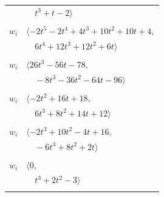 \documentclass[11pt]{article}
\begin{document}
\begin{longtable}{@{}ll@{}}
 & $\quad t^{3}+t-2\rangle$\\
\addlinespace[2pt]
\multicolumn{2}{@{}p{0.97\textwidth}@{}}{$i=17$, $D_i=1$, $\rho_{ij}$: $3{:}1, \allowbreak 4{:}2, \allowbreak 5{:}1, \allowbreak 6{:}1, \allowbreak 11{:}1, \allowbreak 16{:}2, \allowbreak 26{:}2, \allowbreak 27{:}1$}\\
$w_i$ & $\langle -2t^{5}-2t^{4}+4t^{3}+10t^{2}+10t+4,$\\
 & $\quad 6t^{4}+12t^{3}+12t^{2}+6t\rangle$\\
\addlinespace[2pt]
\multicolumn{2}{@{}p{0.97\textwidth}@{}}{$i=18$, $D_i=1$, $\rho_{ij}$: $0{:}2, \allowbreak 1{:}2, \allowbreak 3{:}1, \allowbreak 5{:}2, \allowbreak 6{:}2, \allowbreak 9{:}2, \allowbreak 13{:}1, \allowbreak 14{:}1, \allowbreak 23{:}1, \allowbreak 24{:}1, \allowbreak 28{:}1, \allowbreak 36{:}1, \allowbreak 37{:}2, \allowbreak 40{:}2, \allowbreak 43{:}2$}\\
$w_i$ & $\langle 26t^{3}-56t-78,$\\
 & $\quad -8t^{3}-36t^{2}-64t-96\rangle$\\
\addlinespace[2pt]
\multicolumn{2}{@{}p{0.97\textwidth}@{}}{$i=19$, $D_i=1$, $\rho_{ij}$: $0{:}2, \allowbreak 1{:}1, \allowbreak 3{:}1, \allowbreak 12{:}1, \allowbreak 15{:}1, \allowbreak 28{:}2, \allowbreak 29{:}2, \allowbreak 32{:}2, \allowbreak 42{:}1, \allowbreak 43{:}2$}\\
$w_i$ & $\langle -2t^{2}+16t+18,$\\
 & $\quad 6t^{3}+8t^{2}+14t+12\rangle$\\
\addlinespace[2pt]
\multicolumn{2}{@{}p{0.97\textwidth}@{}}{$i=20$, $D_i=1$, $\rho_{ij}$: $13{:}1, \allowbreak 14{:}2, \allowbreak 15{:}1, \allowbreak 22{:}2, \allowbreak 32{:}2, \allowbreak 37{:}1, \allowbreak 38{:}2, \allowbreak 41{:}1$}\\
$w_i$ & $\langle -2t^{3}+10t^{2}-4t+16,$\\
 & $\quad -6t^{3}+8t^{2}+2t\rangle$\\
\addlinespace[2pt]
\multicolumn{2}{@{}p{0.97\textwidth}@{}}{$i=21$, $D_i=1$, $\rho_{ij}$: $3{:}2, \allowbreak 10{:}1, \allowbreak 12{:}2, \allowbreak 35{:}1, \allowbreak 38{:}1$}\\
$w_i$ & $\langle 0,$\\
 & $\quad t^{3}+2t^{2}-3\rangle$\\
\addlinespace[2pt]
\multicolumn{2}{@{}p{0.97\textwidth}@{}}{$i=22$, $D_i=1$, $\rho_{ij}$: $20{:}1, \allowbreak 25{:}2, \allowbreak 28{:}1, \allowbreak 32{:}2, \allowbreak 37{:}1, \allowbreak 39{:}2, \allowbreak 40{:}1$}\\

\end{longtable}
\end{document}
